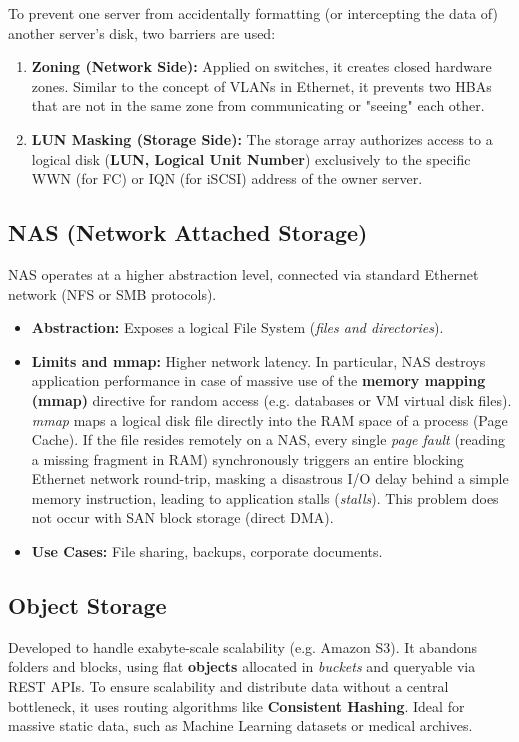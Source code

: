 \begin{tipbox}
To prevent one server from accidentally formatting (or intercepting the data of) another server's disk, two barriers are used:
\begin{enumerate}
    \item \textbf{Zoning (Network Side):} Applied on switches, it creates closed hardware zones. Similar to the concept of VLANs in Ethernet, it prevents two HBAs that are not in the same zone from communicating or "seeing" each other.
    \item \textbf{LUN Masking (Storage Side):} The storage array authorizes access to a logical disk (\textbf{LUN, Logical Unit Number}) exclusively to the specific WWN (for FC) or IQN (for iSCSI) address of the owner server.
\end{enumerate}
\end{tipbox}

\subsection{NAS (Network Attached Storage)}
NAS operates at a higher abstraction level, connected via standard Ethernet network (NFS or SMB protocols).
\begin{itemize}
    \item \textbf{Abstraction:} Exposes a logical File System (\textit{files and directories}).
    \item \textbf{Limits and mmap:} Higher network latency. In particular, NAS destroys application performance in case of massive use of the \textbf{memory mapping (mmap)} directive for random access (e.g. databases or VM virtual disk files). \textit{mmap} maps a logical disk file directly into the RAM space of a process (Page Cache). If the file resides remotely on a NAS, every single \textit{page fault} (reading a missing fragment in RAM) synchronously triggers an entire blocking Ethernet network round-trip, masking a disastrous I/O delay behind a simple memory instruction, leading to application stalls (\textit{stalls}). This problem does not occur with SAN block storage (direct DMA).
    \item \textbf{Use Cases:} File sharing, backups, corporate documents.
\end{itemize}

\subsection{Object Storage}
Developed to handle exabyte-scale scalability (e.g. Amazon S3). It abandons folders and blocks, using flat \textbf{objects} allocated in \textit{buckets} and queryable via REST APIs.
To ensure scalability and distribute data without a central bottleneck, it uses routing algorithms like \textbf{Consistent Hashing}. Ideal for massive static data, such as Machine Learning datasets or medical archives.

